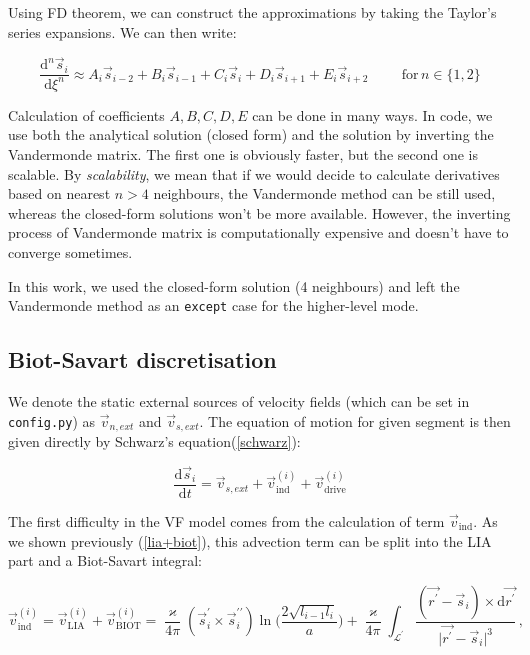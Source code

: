 Using FD theorem, we can construct the approximations by taking the Taylor's series expansions. We can then write:

\begin{equation}
\frac{\text{d}^n\vec{s}_i}{\text{d}\xi^n} \approx
A_i\vec{s}_{i-2} +
B_i\vec{s}_{i-1} +
C_i\vec{s}_{i} +
D_i\vec{s}_{i+1} +
E_i\vec{s}_{i+2}
\hspace{1cm}
\text{for} \,n\in\{1,2\}
\end{equation}

Calculation of coefficients $A, B, C, D, E$ can be done in many ways. In code, we use both the analytical solution (closed form) and the solution by inverting the Vandermonde matrix. The first one is obviously faster, but the second one is scalable. By \textit{scalability}, we mean that if we would decide to calculate derivatives based on nearest $n>4$ neighbours, the Vandermonde method can be still used, whereas the closed-form solutions won't be more available. However, the inverting process of Vandermonde matrix is computationally expensive and doesn't have to converge sometimes.

In this work, we used the closed-form solution (4 neighbours) and left the Vandermonde method as an \texttt{except} case for the higher-level mode.

\subsection*{Biot-Savart discretisation}

We denote the static external sources of velocity fields (which can be set in \texttt{config.py}) as $\vec{v}_{n,ext}$ and $\vec{v}_{s,ext}$. The equation of motion for given segment is then given directly by Schwarz's equation(\ref{schwarz}):

\begin{equation}
\frac{\text{d}\vec{s}_i}{\text{d}t} =
\vec{v}_{s,ext} + \vec{v}_{\text{ind}}^{(i)} + \vec{v}_{\text{drive}}^{(i)}
\end{equation}

The first difficulty in the VF model comes from the calculation of term $\vec{v}_{\text{ind}}$. As we shown previously (\ref{lia+biot}), this advection term can be split into the LIA part and a Biot-Savart integral:

\begin{equation}
\vec{v}_{\text{ind}}^{(i)} =
\vec{v}_{\text{LIA}}^{(i)} + \vec{v}_{\text{BIOT}}^{(i)} =
\frac{\varkappa}{4\pi} (\vec{s}^{\prime}_i \times \vec{s}^{\prime \prime}_i)
\ln{\Bigg(\frac{2\sqrt{l_{i-1} l_i}}{a}\Bigg)}
+ \frac{\varkappa}{4\pi} \int_{\mathcal{L}^{\prime}} \frac{(\vec{r^{\prime}} - \vec{s}_i) \times \text{d}\vec{r^{\prime}}}{\vert \vec{r^{\prime}} - \vec{s}_i \vert^3}\,,
\end{equation}

